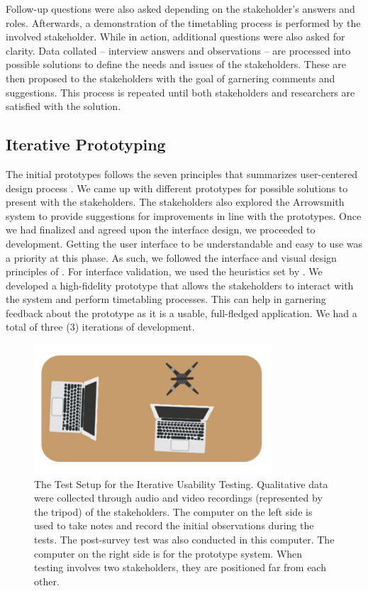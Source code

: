 Follow-up questions were also asked depending on the stakeholder's answers and roles. Afterwards, a demonstration of the timetabling process is performed by the involved stakeholder. While in action, additional questions were also asked for clarity. Data collated -- interview answers and observations -- are processed into possible solutions to define the needs and issues of the stakeholders. These are then proposed to the stakeholders with the goal of garnering comments and suggestions. This process is repeated until both stakeholders and researchers are satisfied with the solution.

\subsection{Iterative Prototyping}
The initial prototypes follows the seven principles that summarizes user-centered design process \cite{Norman:2002:DET:2187809}. We came up with different prototypes for possible solutions to present with the stakeholders. The stakeholders also explored the Arrowsmith system to provide suggestions for improvements in line with the prototypes. Once we had finalized and agreed upon the interface design, we proceeded to development. Getting the user interface to be understandable and easy to use was a priority at this phase. As such, we followed the interface and visual design principles of \cite{Soper2016, Gong2009, Thimbleby}. For interface validation, we used the heuristics set by \cite{Paz}. We developed a high-fidelity prototype that allows the stakeholders to interact with the system and perform timetabling processes. This can help in garnering feedback about the prototype as it is a usable, full-fledged application. We had a total of three (3) iterations of development.

\begin{figure}[h]
   \centering
   \includegraphics[scale=1.0]{Diagrams/Test_Setup.PNG}
   \caption{The Test Setup for the Iterative Usability Testing. Qualitative data were collected through audio and video recordings (represented by the tripod) of the stakeholders. The computer on the left side is used to take notes and record the initial observations during the tests. The post-survey test was also conducted in this computer. The computer on the right side is for the prototype system. When testing involves two stakeholders, they are positioned far from each other.}
    \label{fig:pipelinediagram}
\end{figure}

